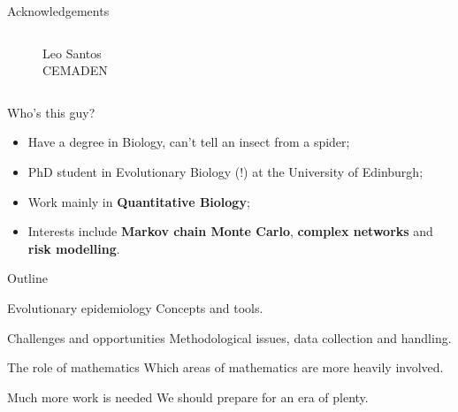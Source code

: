 \documentclass[newPxFont,numfooter,sectionpages]{beamer}
\begin{document}
\begin{frame}{Acknowledgements}
\begin{columns}
\begin{column}{0.3\textwidth}
\begin{figure}
     Leo Santos\\
     CEMADEN
     \end{figure}
\end{column}
\end{columns}
\end{frame}

\begin{frame}{Who's this guy?}
\begin{itemize}
\item Have a degree in Biology, can't tell an insect from a spider;
\item PhD student in Evolutionary Biology (!) at the University of Edinburgh;
\item Work mainly in \textbf{Quantitative Biology};
\item Interests include \textbf{Markov chain Monte Carlo}, \textbf{complex networks} and \textbf{risk modelling}. 
\end{itemize}
\end{frame}

\begin{frame}{Outline}
\begin{alertblock}{Evolutionary epidemiology}
Concepts and tools.
\end{alertblock}\pause
\begin{exampleblock}{Challenges and opportunities}
Methodological issues, data collection and handling.
\end{exampleblock}\pause
\begin{block}{The role of mathematics}
Which areas of mathematics are more heavily involved.
\end{block}\pause
\begingroup
{}
\begin{block}{Much more work is needed}
We should prepare for an era of plenty.
\end{block}
\endgroup
\end{frame}
\end{document}
